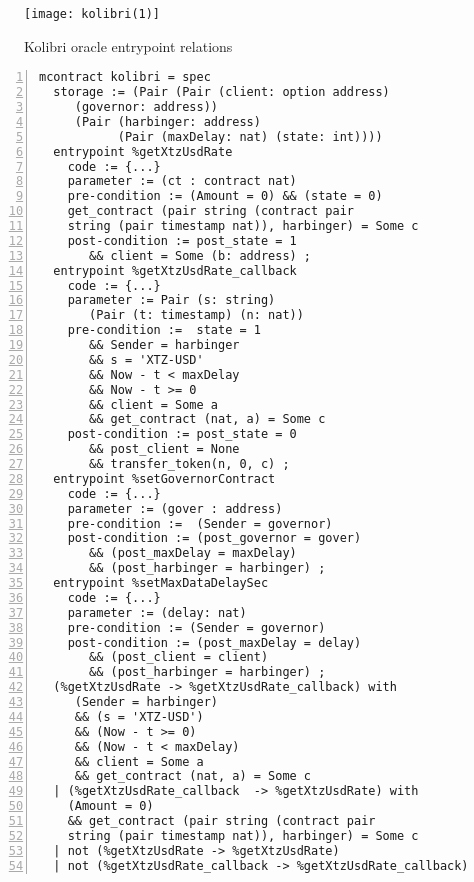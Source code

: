 \begin{figure}[tp]
    \centering
    \texttt{[image: kolibri(1)]}
    \caption{Kolibri oracle entrypoint relations}
    \label{fig:kolibri-oracle-emtrypoint-relations}
\end{figure}
\begin{lstlisting}[float=tp,captionpos=b,caption={Kolibri oracle contract specification},label={lst:kolibri-contract-specification},numbers=left]
mcontract kolibri = spec 
  storage := (Pair (Pair (client: option address) 
     (governor: address))
     (Pair (harbinger: address) 
           (Pair (maxDelay: nat) (state: int))))
  entrypoint %getXtzUsdRate
    code := {...}
    parameter := (ct : contract nat) 
    pre-condition := (Amount = 0) && (state = 0)
    get_contract (pair string (contract pair 
    string (pair timestamp nat)), harbinger) = Some c
    post-condition := post_state = 1
       && client = Some (b: address) ;
  entrypoint %getXtzUsdRate_callback
    code := {...}
    parameter := Pair (s: string) 
       (Pair (t: timestamp) (n: nat))
    pre-condition :=  state = 1 
       && Sender = harbinger  
       && s = 'XTZ-USD' 
       && Now - t < maxDelay 
       && Now - t >= 0 
       && client = Some a 
       && get_contract (nat, a) = Some c    
    post-condition := post_state = 0 
       && post_client = None 
       && transfer_token(n, 0, c) ;
  entrypoint %setGovernorContract
    code := {...}
    parameter := (gover : address) 
    pre-condition :=  (Sender = governor)                  
    post-condition := (post_governor = gover) 
       && (post_maxDelay = maxDelay) 
       && (post_harbinger = harbinger) ;
  entrypoint %setMaxDataDelaySec
    code := {...}
    parameter := (delay: nat)
    pre-condition := (Sender = governor)             
    post-condition := (post_maxDelay = delay) 
       && (post_client = client) 
       && (post_harbinger = harbinger) ;
  (%getXtzUsdRate -> %getXtzUsdRate_callback) with
     (Sender = harbinger)
     && (s = 'XTZ-USD') 
     && (Now - t >= 0)  
     && (Now - t < maxDelay)  
     && client = Some a 
     && get_contract (nat, a) = Some c    
  | (%getXtzUsdRate_callback  -> %getXtzUsdRate) with 
    (Amount = 0) 
    && get_contract (pair string (contract pair 
    string (pair timestamp nat)), harbinger) = Some c
  | not (%getXtzUsdRate -> %getXtzUsdRate) 
  | not (%getXtzUsdRate_callback -> %getXtzUsdRate_callback)
\end{lstlisting}
